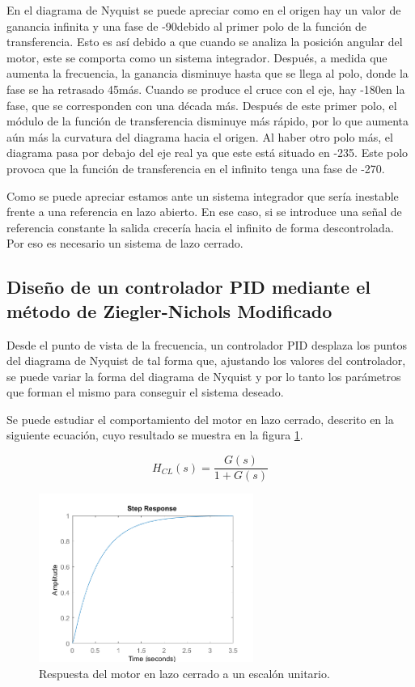 \documentclass[a4paper]{article}
\begin{document}
En el diagrama de Nyquist se puede apreciar como en el origen hay un valor de ganancia infinita y una fase de -90\degree  debido al primer polo de la función de transferencia. Esto es así debido a que cuando se analiza la posición angular del motor, este se comporta como un sistema integrador. Después, a medida que aumenta la frecuencia, la ganancia disminuye hasta que se llega al polo, donde la fase se ha retrasado 45\degree  más. Cuando se produce el cruce con el eje, hay -180\degree  en la fase, que se corresponden con una década más. Después de este primer polo, el módulo de la función de transferencia disminuye más rápido, por lo que aumenta aún más la curvatura del diagrama hacia el origen. Al haber otro polo más, el diagrama pasa por debajo del eje real ya que este está situado en -235\degree. Este polo provoca que la función de transferencia en el infinito tenga una fase de -270\degree.

Como se puede apreciar estamos ante un sistema integrador que sería inestable frente a una referencia en lazo abierto. En ese caso, si se introduce una señal de referencia constante la salida crecería hacia el infinito de forma descontrolada. Por eso es necesario un sistema de lazo cerrado.

\subsection{Diseño de un controlador PID mediante el método de  Ziegler-Nichols Modificado}
Desde el punto de vista de la frecuencia, un controlador PID desplaza los puntos del diagrama de Nyquist de tal forma que, ajustando los valores del controlador, se puede variar la forma del diagrama de Nyquist y por lo tanto los parámetros que forman el mismo para conseguir el sistema deseado.

Se puede estudiar el comportamiento del motor en lazo cerrado, descrito en la siguiente ecuación, cuyo resultado se muestra en la figura \ref{fig:cl}.

\begin{equation}
H_{CL}(s)=\frac{G(s)}{1 + G(s)}
\end{equation}


\begin{figure}[htp]
	\centering
	\includegraphics[width=7cm]{lazo_cerrado}
	\caption{Respuesta del motor en lazo cerrado a un escalón unitario.}
	\label{fig:cl}
\end{figure}
\end{document}
